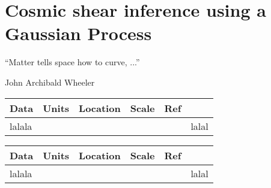 \documentclass[ucdthesis.tex]{subfiles}
\begin{document}
    
    \doublespacing
		\setcounter{chapter}{3}
		\chapter{Cosmic shear inference using a Gaussian Process}{}{}
		\label{chapter4}
    \epigraph{``Matter tells space how to curve, ...''}{John Archibald Wheeler} 

\begin{table}
\begin{center} 
\begin{tabular}{@{}lccccc}
\hline \hline Data & Units & Location & Scale & Ref \\ \hline
	lalala & & &&& lalal\\
\hline 
\end{tabular} 
\end{center} 
\end{table} 

\begin{table}
\begin{center} 
\begin{tabular}{@{}lccccc}
\hline \hline Data & Units & Location & Scale & Ref \\ \hline
	lalala & & &&& lalal\\
\hline 
\end{tabular} 
\end{center} 
\end{table} 
						 

        
\end{document}
